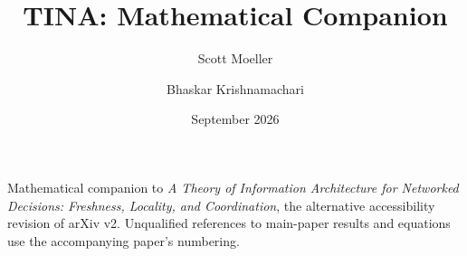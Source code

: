 \documentclass[11pt]{article}
\begin{document}
\title{TINA: Mathematical Companion}
\author{Scott Moeller \and Bhaskar Krishnamachari}
\date{September 2026}
\maketitle
\noindent Mathematical companion to \emph{A Theory of Information Architecture for Networked
Decisions: Freshness, Locality, and Coordination}, the alternative accessibility revision of arXiv v2.
Unqualified references to main-paper results and equations use the accompanying paper's numbering.


\end{document}
